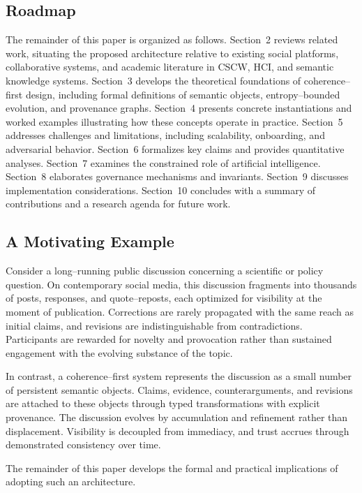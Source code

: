 \documentclass[11pt]{article}
\begin{document}
\subsection{Roadmap}

The remainder of this paper is organized as follows. Section~2 reviews related work,
situating the proposed architecture relative to existing social platforms, collaborative
systems, and academic literature in CSCW, HCI, and semantic knowledge systems.
Section~3 develops the theoretical foundations of coherence--first design, including
formal definitions of semantic objects, entropy--bounded evolution, and provenance
graphs. Section~4 presents concrete instantiations and worked examples illustrating how
these concepts operate in practice. Section~5 addresses challenges and limitations,
including scalability, onboarding, and adversarial behavior. Section~6 formalizes key
claims and provides quantitative analyses. Section~7 examines the constrained role of
artificial intelligence. Section~8 elaborates governance mechanisms and invariants.
Section~9 discusses implementation considerations. Section~10 concludes with a summary
of contributions and a research agenda for future work.

\subsection{A Motivating Example}

Consider a long--running public discussion concerning a scientific or policy question.
On contemporary social media, this discussion fragments into thousands of posts,
responses, and quote--reposts, each optimized for visibility at the moment of publication.
Corrections are rarely propagated with the same reach as initial claims, and revisions
are indistinguishable from contradictions. Participants are rewarded for novelty and
provocation rather than sustained engagement with the evolving substance of the topic.

In contrast, a coherence--first system represents the discussion as a small number of
persistent semantic objects. Claims, evidence, counterarguments, and revisions are
attached to these objects through typed transformations with explicit provenance. The
discussion evolves by accumulation and refinement rather than displacement. Visibility
is decoupled from immediacy, and trust accrues through demonstrated consistency over
time.

The remainder of this paper develops the formal and practical implications of adopting
such an architecture.
\end{document}
